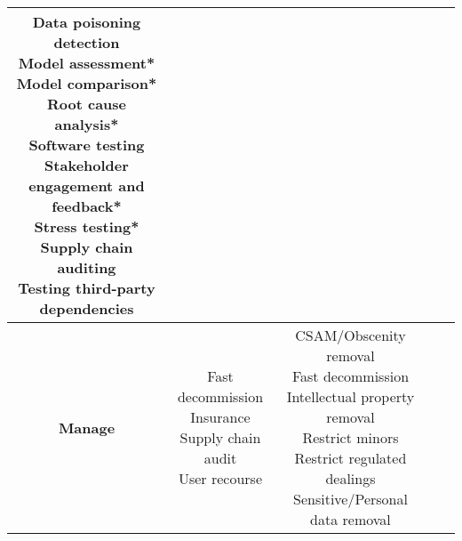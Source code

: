 \documentclass[fleqn]{article}
\begin{document}
\begin{landscape}
\begin{table}[H]
\begin{tabular}{|c|c|c|c|c|}
{			\textbullet\hspace{3pt} Data poisoning detection \\ 
			\textbullet\hspace{3pt} Model assessment*\\ 
			\textbullet\hspace{3pt} Model comparison*\\ 
			\textbullet\hspace{3pt} Root cause analysis*\\ 
			\textbullet\hspace{3pt} Software testing \\ 
			\textbullet\hspace{3pt} Stakeholder engagement and feedback*\\ 
			\textbullet\hspace{3pt} Stress testing*\\ 
			\textbullet\hspace{3pt} Supply chain auditing \\ 
			\textbullet\hspace{3pt} Testing third-party dependencies \\
		}
		\\
		\hline
		\textbf{Manage} 
		& \makecell[l]{
			\textbullet\hspace{3pt} Fast decommission \\ 	
			\textbullet\hspace{3pt} Insurance \\ 		
			\textbullet\hspace{3pt} Supply chain audit \\ 	
			\textbullet\hspace{3pt} User recourse \\						 	 
		}
		& \makecell[l]{
			\textbullet\hspace{3pt} CSAM/Obscenity removal \\ 	
			\textbullet\hspace{3pt} Fast decommission \\ 		
			\textbullet\hspace{3pt} Intellectual property removal \\ 	
			\textbullet\hspace{3pt} Restrict minors \\ 	
			\textbullet\hspace{3pt} Restrict regulated dealings \\ 	
			\textbullet\hspace{3pt} Sensitive/Personal data removal \\ 	
}
\end{tabular}
\end{table}
\end{landscape}
\end{document}
